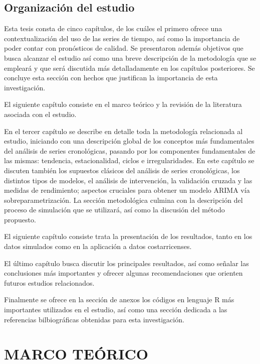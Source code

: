 \documentclass[
]{article}
\begin{document}
\subsection{Organización del estudio}

Esta tesis consta de cinco capítulos, de los cuáles el primero ofrece
una contextualización del uso de las series de tiempo, así como la
importancia de poder contar con pronósticos de calidad. Se presentaron
además objetivos que busca alcanzar el estudio así como una breve
descripción de la metodología que se empleará y que será discutida más
detalladamente en los capítulos posteriores. Se concluye esta sección
con hechos que justifican la importancia de esta investigación.

El siguiente capítulo consiste en el marco teórico y la revisión de la
literatura asociada con el estudio.

En el tercer capítulo se describe en detalle toda la metodología
relacionada al estudio, iniciando con una descripción global de los
conceptos más fundamentales del análisis de series cronológicas, pasando
por los componentes fundamentales de las mismas: tendencia,
estacionalidad, ciclos e irregularidades. En este capítulo se discuten
también los supuestos clásicos del análisis de series cronológicas, los
distintos tipos de modelos, el análisis de intervención, la validación
cruzada y las medidas de rendimiento; aspectos cruciales para obtener un
modelo ARIMA vía sobreparametrización. La sección metodológica culmina
con la descripción del proceso de simulación que se utilizará, así como
la discusión del método propuesto.

El siguiente capítulo consiste trata la presentación de los resultados,
tanto en los datos simulados como en la aplicación a datos
costarricenses.

El último capítulo busca discutir los principales resultados, así como
señalar las conclusiones más importantes y ofrecer algunas
recomendaciones que orienten futuros estudios relacionados.

Finalmente se ofrece en la sección de anexos los códigos en lenguaje R
más importantes utilizados en el estudio, así como una sección dedicada
a las referencias bilbiográficas obtenidas para esta investigación.

\newpage

\section{MARCO TEÓRICO}
\end{document}
